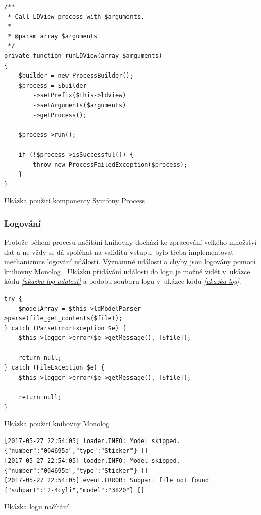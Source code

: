 \begin{listing}[htbp]
        \begin{verbatim}
/**
 * Call LDView process with $arguments.
 *
 * @param array $arguments
 */
private function runLDView(array $arguments)
{
    $builder = new ProcessBuilder();
    $process = $builder
        ->setPrefix($this->ldview)
        ->setArguments($arguments)
        ->getProcess();

    $process->run();

    if (!$process->isSuccessful()) {
        throw new ProcessFailedException($process);
    }
}
        \end{verbatim}
    \caption{Ukázka použití komponenty Symfony Process \label{ukazka-stlconverter}}
\end{listing}

\subsubsection*{Logování}
Protože během procesu načítání knihovny dochází ke zpracování velkého množství dat a ne vždy se dá spoléhat na validitu vstupu, bylo třeba implementovat mechanizmus logování událostí. Významné události a chyby jsou logovány pomocí knihovny Monolog \autocite{symfony:monolog}. Ukázku přidávání události do logu je možné vidět v~ukázce kódu \emph{\ref{ukazka-log-udalost}} a podobu souboru logu v~ukázce kódu \emph{\ref{ukazka-log}}.

\begin{listing}[htbp]
        \begin{verbatim}
try {
    $modelArray = $this->ldModelParser->parse(file_get_contents($file));
} catch (ParseErrorException $e) {
    $this->logger->error($e->getMessage(), [$file]);

    return null;
} catch (FileException $e) {
    $this->logger->error($e->getMessage(), [$file]);

    return null;
}
        \end{verbatim}
    \caption{Ukázka použití knihovny Monolog \label{ukazka-log-udalost}}
\end{listing}

\begin{listing}[htbp]
        \begin{verbatim}
[2017-05-27 22:54:05] loader.INFO: Model skipped. {"number":"004695a","type":"Sticker"} []
[2017-05-27 22:54:05] loader.INFO: Model skipped. {"number":"004695b","type":"Sticker"} []
[2017-05-27 22:54:05] event.ERROR: Subpart file not found {"subpart":"2-4cyli","model":"3820"} []
        \end{verbatim}
    \caption{Ukázka logu načítání\label{ukazka-log}}
\end{listing}

